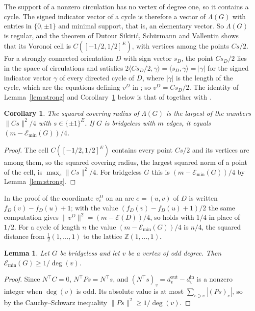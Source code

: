 \documentclass[11pt]{amsart}
\newtheorem{lem}[thm]{Lemma}
\newtheorem{cor}[thm]{Corollary}
\theoremstyle{definition}
\theoremstyle{remark}
\numberwithin{equation}{section}
\newcommand{\Emin}{\mathcal E_{\min}}
\newcommand{\Z}{\mathbb Z}
\begin{document}
The support of a nonzero circulation has no vertex of degree one, so it contains a cycle. The signed indicator vector of a cycle is therefore a vector of $\Lambda(G)$ with entries in $\{0,\pm1\}$ and minimal support, that is, an elementary vector. So $\Lambda(G)$ is regular, and the theorem of Dutour Sikiri\'c, Sch\"urmann and Vallentin \cite[Theorem~2]{DSV09} shows that its Voronoi cell is $C([-1/2,1/2]^E)$, with vertices among the points $Cs/2$. For a strongly connected orientation $D$ with sign vector $s_D$, the point $Cs_D/2$ lies in the space of circulations and satisfies $2\langle Cs_D/2,\gamma\rangle=\langle s_D,\gamma\rangle=|\gamma|$ for the signed indicator vector $\gamma$ of every directed cycle of $D$, where $|\gamma|$ is the length of the cycle, which are the equations defining $v^D$ in \cite[Lemma~8]{Amini}; so $v^D=Cs_D/2$. The identity of Lemma~\ref{lem:strong} and Corollary~\ref{cor:radius} below is that of \cite[Theorem~2]{DSV09} together with \cite[Lemma~8, Proposition~12]{Amini}.

\begin{cor}\label{cor:radius}
The squared covering radius of $\Lambda(G)$ is the largest of the numbers $\|Cs\|^2/4$ with $s\in\{\pm1\}^E$. If $G$ is bridgeless with $m$ edges, it equals $(m-\Emin(G))/4$.
\end{cor}

\begin{proof}
The cell $C([-1/2,1/2]^E)$ contains every point $Cs/2$ and its vertices are among them, so the squared covering radius, the largest squared norm of a point of the cell, is $\max_s\|Cs\|^2/4$. For bridgeless $G$ this is $(m-\Emin(G))/4$ by Lemma~\ref{lem:strong}.
\end{proof}

In the proof of \cite[Lemma~13]{Amini} the coordinate $v^D_e$ on an arc $e=(u,v)$ of $D$ is written $f_D(v)-f_D(u)+1$; with the value $(f_D(v)-f_D(u)+1)/2$ the same computation gives $\|v^D\|^2=(m-\mathcal E(D))/4$, so \cite[Definition--Theorem~14]{Amini} holds with $1/4$ in place of $1/2$. For a cycle of length $n$ the value $(m-\Emin(G))/4$ is $n/4$, the squared distance from $\tfrac12(1,\dots,1)$ to the lattice $\Z(1,\dots,1)$.

\begin{lem}\label{lem:lower}
Let $G$ be bridgeless and let $v$ be a vertex of odd degree. Then $\Emin(G)\ge1/\deg(v)$.
\end{lem}

\begin{proof}
Since $N^{\top}C=0$, $N^{\top}Ps=N^{\top}s$, and $(N^{\top}s)_v=d^{\mathrm{out}}_v-d^{\mathrm{in}}_v$ is a nonzero integer when $\deg(v)$ is odd. Its absolute value is at most $\sum_{e\ni v}|(Ps)_e|$, so by the Cauchy--Schwarz inequality $\|Ps\|^2\ge1/\deg(v)$.
\end{proof}
\end{document}

